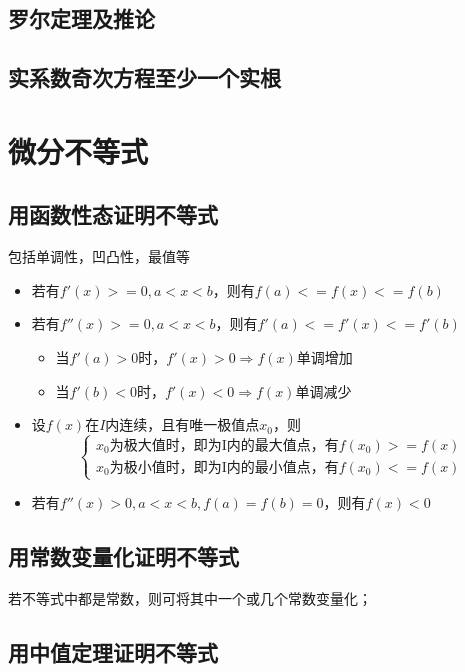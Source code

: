 \subsection{罗尔定理及推论}

\subsection{实系数奇次方程至少一个实根}


\section{微分不等式}

\subsection{用函数性态证明不等式}
包括单调性，凹凸性，最值等\begin{itemize}
    \item 若有\(f'(x) >= 0, a < x < b\)，则有\(f(a) <= f(x) <= f(b)\)
    \item 若有\(f''(x) >= 0, a < x < b\)，则有\(f'(a) <= f'(x) <= f'(b)\)\begin{itemize}
        \item 当\(f'(a) > 0\)时，\(f'(x) > 0 \Rightarrow f(x)\)单调增加
        \item 当\(f'(b) < 0\)时，\(f'(x) < 0 \Rightarrow f(x)\)单调减少
    \end{itemize}
    \item 设\(f(x)\)在\(I\)内连续，且有唯一极值点\(x_0\)，则\[\begin{cases}
        x_0\text{为极大值时，即为I内的最大值点，有}f(x_0) >= f(x) \\ 
        x_0\text{为极小值时，即为I内的最小值点，有}f(x_0) <= f(x)
    \end{cases}\]
    \item 若有\(f''(x) > 0, a < x < b, f(a) = f(b) = 0\)，则有\(f(x) < 0\)
\end{itemize}


\subsection{用常数变量化证明不等式}
若不等式中都是常数，则可将其中一个或几个常数变量化；


\subsection{用中值定理证明不等式}


